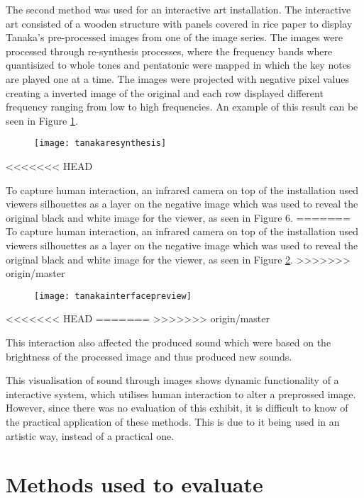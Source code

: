 The second method was used for an interactive art installation. The interactive art consisted of a wooden structure with panels covered in rice paper to display Tanaka's pre-processed images from one of the image series. The images were processed through re-synthesis processes, where the frequency bands where quantisized to whole tones and pentatonic were mapped in which the key notes are played one at a time. The images were projected with negative pixel values creating a inverted image of the original and each row displayed different frequency ranging from low to high frequencies. An example of this result can be seen in Figure \ref{fig:tanakaresynthesis}.  

\begin{figure}[!h]
\centering
\texttt{[image: tanakaresynthesis]}
\caption{\label{fig:tanakaresynthesis}\cite{Tanaka2012}}
\end{figure}
\cite{Tanaka2012}

<<<<<<< HEAD

To capture human interaction, an infrared camera on top of the installation used viewers silhouettes as a layer on the negative image which was used to reveal the original black and white image for the viewer, as seen in Figure 6.
=======
To capture human interaction, an infrared camera on top of the installation used viewers silhouettes as a layer on the negative image which was used to reveal the original black and white image for the viewer, as seen in Figure \ref{fig:tanakainterfacepreview}.
>>>>>>> origin/master

\begin{figure}[!h]
\centering
\texttt{[image: tanakainterfacepreview]}
\caption{\label{fig:tanakainterfacepreview}\cite{Tanaka2012}}
\end{figure}
<<<<<<< HEAD
\cite{Tanaka2012}
=======
>>>>>>> origin/master

This interaction also affected the produced sound which were based on the brightness of the processed image and thus produced new sounds. 

This visualisation of sound through images shows dynamic functionality of a interactive system, which utilises human interaction to alter a preprossed image. However, since there was no evaluation of this exhibit, it is difficult to know of the practical application of these methods. This is due to it being used in an artistic way, instead of a practical one.   

\section{Methods used to evaluate}\label{sub:methodsusedtoevaluate}

